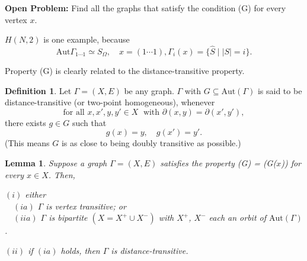 \documentclass[
]{book}
\newtheorem{lemma}{Lemma}[chapter]
\theoremstyle{definition}
\newtheorem{definition}{Definition}[chapter]
\theoremstyle{definition}
\theoremstyle{definition}
\theoremstyle{definition}
\theoremstyle{remark}
\begin{document}
\textbf{Open Problem:}
Find all the graphs that satisfy the condition (G) for every vertex \(x\).

\(H(N, 2)\) is one example, because
\[\mathrm{Aut}\Gamma_{1\cdots 1} \simeq S_\Omega, \quad x = (1\cdots 1), \Gamma_i(x)
 = \{\hat{S} \mid |S| = i\}.\]

Property (G) is clearly related to the distance-transitive property.

\begin{definition}
Let \(\Gamma = (X, E)\) be any graph. \(\Gamma\) with \(G\subseteq \mathrm{Aut}(\Gamma)\) is said to be distance-transitive  (or two-point homogeneous), whenever
\[\text{for all } x, x', y, y'\in X \; \text{ with } \partial(x,y) = \partial(x',y'),\]
there exists \(g\in G\) such that
\[g(x) = y,\quad g(x') = y'.\]
(This means \(G\) is as close to being doubly transitive as possible.)
\end{definition}

\begin{lemma}

Suppose a graph \(\Gamma = (X, E)\) satisfies the property \textrm{(G) = (G($x$))} for every \(x\in X\). Then,

\((i)\) either\\
\(\quad (ia)\) \(\Gamma\) is vertex transitive; or\\
\(\quad (iia)\) \(\Gamma\) is bipartite \((X = X^+ \cup X^-)\) with \(X^+\), \(X^-\) each an orbit of \(\mathrm{Aut}(\Gamma)\).

\((ii)\) if \((ia)\) holds, then \(\Gamma\) is distance-transitive.

\end{lemma}
\end{document}
